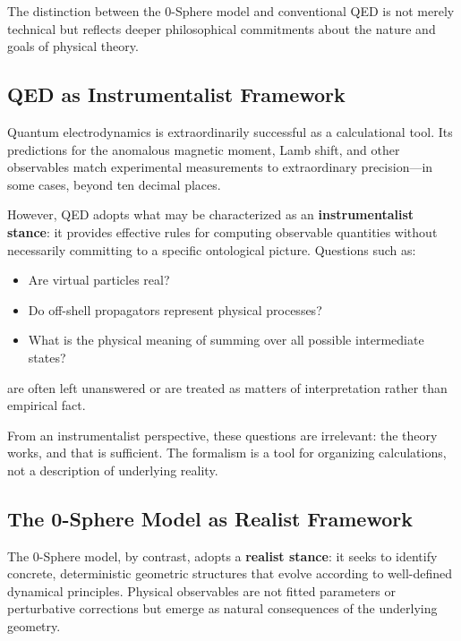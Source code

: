 \documentclass[12pt,letterpaper]{article}
\begin{document}
The distinction between the 0-Sphere model and conventional QED is not merely technical but reflects deeper philosophical commitments about the nature and goals of physical theory.

\subsection{QED as Instrumentalist Framework}

Quantum electrodynamics is extraordinarily successful as a calculational tool. Its predictions for the anomalous magnetic moment, Lamb shift, and other observables match experimental measurements to extraordinary precision—in some cases, beyond ten decimal places.

However, QED adopts what may be characterized as an \textbf{instrumentalist stance}: it provides effective rules for computing observable quantities without necessarily committing to a specific ontological picture. Questions such as:
\begin{itemize}
\item Are virtual particles real?
\item Do off-shell propagators represent physical processes?
\item What is the physical meaning of summing over all possible intermediate states?
\end{itemize}
are often left unanswered or are treated as matters of interpretation rather than empirical fact.

From an instrumentalist perspective, these questions are irrelevant: the theory works, and that is sufficient. The formalism is a tool for organizing calculations, not a description of underlying reality.

\subsection{The 0-Sphere Model as Realist Framework}

The 0-Sphere model, by contrast, adopts a \textbf{realist stance}: it seeks to identify concrete, deterministic geometric structures that evolve according to well-defined dynamical principles. Physical observables are not fitted parameters or perturbative corrections but emerge as natural consequences of the underlying geometry.
\end{document}
